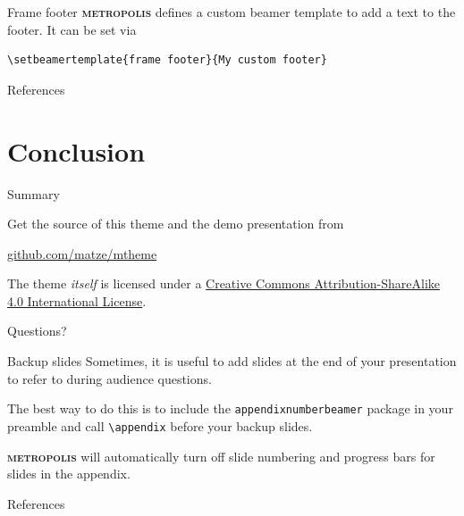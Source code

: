 \documentclass[10pt]{beamer}
\newcommand{\themename}{\textbf{\textsc{metropolis}}\xspace}
\begin{document}
{%
\begin{frame}[fragile]{Frame footer}
    \themename defines a custom beamer template to add a text to the footer. It can be set via
    \begin{verbatim}\setbeamertemplate{frame footer}{My custom footer}\end{verbatim}
\end{frame}
}

\begin{frame}{References}
  \cite{Tanaka2013Larger}
\end{frame}

\section{Conclusion}

\begin{frame}{Summary}

  Get the source of this theme and the demo presentation from

  \begin{center}\url{github.com/matze/mtheme}\end{center}

  The theme \emph{itself} is licensed under a
  \href{http://creativecommons.org/licenses/by-sa/4.0/}{Creative Commons
  Attribution-ShareAlike 4.0 International License}.

  \begin{center}\ccbysa\end{center}

\end{frame}

\begin{frame}[standout]
  Questions?
\end{frame}

\appendix

\begin{frame}[fragile]{Backup slides}
  Sometimes, it is useful to add slides at the end of your presentation to
  refer to during audience questions.

  The best way to do this is to include the \verb|appendixnumberbeamer|
  package in your preamble and call \verb|\appendix| before your backup slides.

  \themename will automatically turn off slide numbering and progress bars for
  slides in the appendix.
\end{frame}

\begin{frame}[allowframebreaks]{References}
  \printbibliography

\end{frame}
\end{document}
